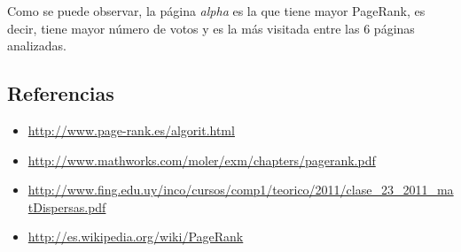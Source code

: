 \documentclass[letterpaper,11pt]{article}
\begin{document}
\bigskip

Como se puede observar, la página \emph{alpha} es la que tiene mayor PageRank, es decir, tiene mayor número de votos y es la más visitada entre las 6 páginas analizadas.

\subsection*{Referencias}
\begin{itemize}

\item \url{ http://www.page-rank.es/algorit.html }
\item \url{ http://www.mathworks.com/moler/exm/chapters/pagerank.pdf}
\item \url{ http://www.fing.edu.uy/inco/cursos/comp1/teorico/2011/clase_23_2011_matDispersas.pdf}
\item \url{ http://es.wikipedia.org/wiki/PageRank} 


\end{itemize}
\end{document}
